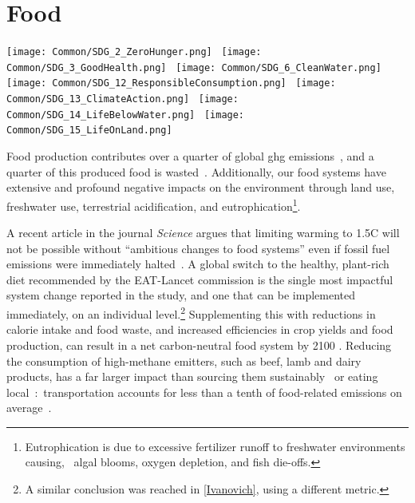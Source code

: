 \documentclass[../SustainableHEP.tex]{subfiles}
\begin{document}
\RaggedRight
\sloppy
\newpage


\section{Food}
\label{sec:Food}

\begin{center}
\texttt{[image: Common/SDG\_2\_ZeroHunger.png]}~%
\texttt{[image: Common/SDG\_3\_GoodHealth.png]}~%
\texttt{[image: Common/SDG\_6\_CleanWater.png]}~%
\texttt{[image: Common/SDG\_12\_ResponsibleConsumption.png]}~%
\texttt{[image: Common/SDG\_13\_ClimateAction.png]}~%
\texttt{[image: Common/SDG\_14\_LifeBelowWater.png]}~%
\texttt{[image: Common/SDG\_15\_LifeOnLand.png]}
\end{center}


\exSum

\noindent Food production contributes over a quarter of global \acrshort{ghg} emissions~\cite{USEPA}, and a quarter of this produced food is wasted~\cite{Searchinger2018}.  Additionally, our food systems have extensive and profound negative impacts on the environment through land use, freshwater use, terrestrial acidification, and eutrophication\footnote{Eutrophication is due to excessive fertilizer runoff to freshwater environments causing, \eg\ algal blooms, oxygen depletion, and fish die-offs.}.  

A recent article in the journal \textit{Science} argues that limiting warming to 1.5\degree C will not be possible without ``ambitious changes to food systems'' even if fossil fuel emissions were immediately halted~\cite{Clark370}.  A global switch to the healthy, plant-rich diet recommended by the EAT-Lancet commission \cite{WILLETT2019447} is the single most impactful system change reported in the study, and one that can be implemented immediately, on an individual level.\footnote{A similar conclusion was reached in \ref{Ivanovich}, using a different metric.}  Supplementing this with reductions in calorie intake and food waste, and increased efficiencies in  crop yields and food production, can result in a net carbon-neutral food system by 2100 \cite{Clark370}. 
Reducing the consumption of high-methane emitters, such as beef, lamb and dairy products, has a far larger impact than sourcing them sustainably~\cite{PooreNemecek2018,OWID-Sustainable} or eating local~\cite{OWID-Local}:~transportation accounts for less than a tenth of food-related emissions on average~\cite{PooreNemecek2018}.
\end{document}
